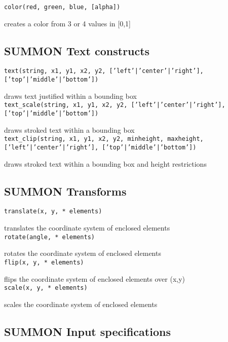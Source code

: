 {\tt color(red, green, blue, [alpha]) }

creates a color from 3 or 4 values in [0,1] \\


\subsection{ SUMMON Text constructs }

{\tt text(string, x1, y1, x2, y2, ['left'|'center'|'right'], ['top'|'middle'|'bottom']) }

draws text justified within a bounding box \\


{\tt text\_scale(string, x1, y1, x2, y2, ['left'|'center'|'right'], ['top'|'middle'|'bottom']) }

draws stroked text within a bounding box \\


{\tt text\_clip(string, x1, y1, x2, y2, minheight, maxheight, ['left'|'center'|'right'], ['top'|'middle'|'bottom']) }

draws stroked text within a bounding box and height restrictions \\


\subsection{ SUMMON Transforms }

{\tt translate(x, y, * elements) }

translates the coordinate system of enclosed elements \\


{\tt rotate(angle, * elements) }

rotates the coordinate system of enclosed elements \\


{\tt flip(x, y, * elements) }

flips the coordinate system of enclosed elements over (x,y) \\


{\tt scale(x, y, * elements) }

scales the coordinate system of enclosed elements \\


\subsection{ SUMMON Input specifications }


